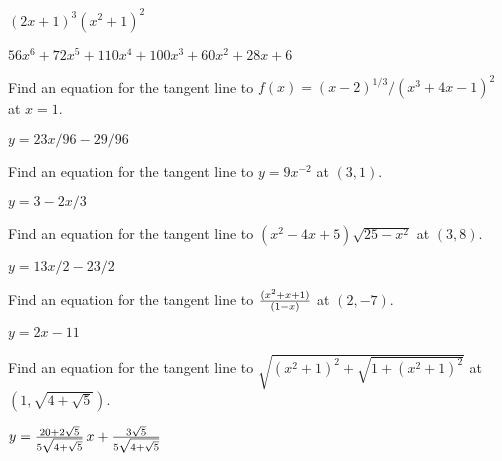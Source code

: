 \begin{exercises}
\begin{exercise} $(2x+1)^3(x^2+1)^2$
\begin{answer} $56x^6+72x^5+110x^4+100x^3+60x^2+28x+6$
\end{answer}\end{exercise}

\endtwocol

\begin{exercise}  Find an equation for the tangent line to 
$f(x) = (x-2)^{1/3}/(x^3 + 4x - 1)^2$ at $x=1$.
\begin{answer} $y=23x/96-29/96$
\end{answer}\end{exercise}

\begin{exercise} Find an equation for the tangent line to $y=9x^{-2}$ at $(3,1)$.
\begin{answer} $y=3-2x/3$
\end{answer}\end{exercise}

\begin{exercise} Find an equation for the tangent line to $(x^2-4x+5)\sqrt{25-x^2}$ 
at $(3,8)$.
\begin{answer} $y=13x/2-23/2$
\end{answer}\end{exercise}

\begin{exercise} Find an equation for the tangent line to ${(x^2+x+1)\over(1-x)}$ 
at $(2,-7)$.
\begin{answer} $y=2x-11$
\end{answer}\end{exercise}

\begin{exercise} Find an equation for the tangent line to 
$\sqrt{(x^2+1)^2+\sqrt{1+(x^2+1)^2}}$
at $(1,\sqrt{4+\sqrt{5}})$.
\begin{answer} $y=
{20+2\sqrt5\over5\sqrt{4+\sqrt5}}\,x+{3\sqrt5\over5\sqrt{4+\sqrt5}}$
\end{answer}\end{exercise}

\end{exercises}






















